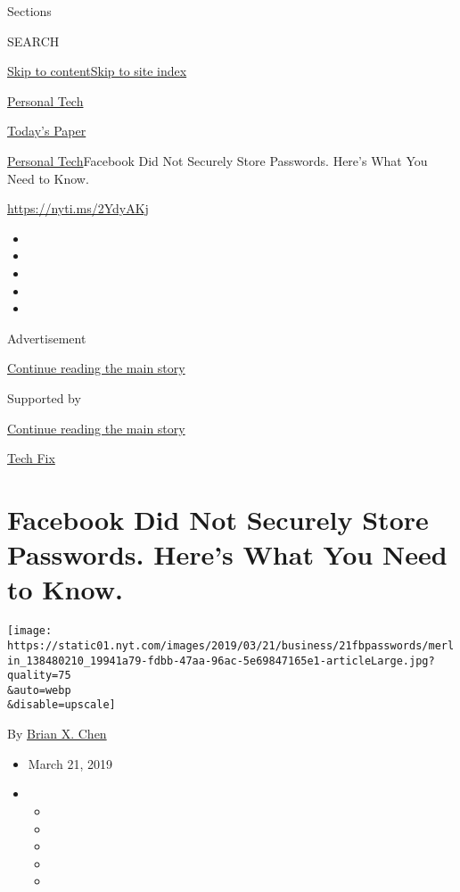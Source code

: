 Sections

SEARCH

\protect\hyperlink{site-content}{Skip to
content}\protect\hyperlink{site-index}{Skip to site index}

\href{https://www.nytimes.com/section/technology/personaltech}{Personal
Tech}

\href{https://myaccount.nytimes.com/auth/login?response_type=cookie\&client_id=vi}{}

\href{https://www.nytimes.com/section/todayspaper}{Today's Paper}

\href{/section/technology/personaltech}{Personal Tech}\textbar{}Facebook
Did Not Securely Store Passwords. Here's What You Need to Know.

\url{https://nyti.ms/2YdyAKj}

\begin{itemize}
\item
\item
\item
\item
\item
\end{itemize}

Advertisement

\protect\hyperlink{after-top}{Continue reading the main story}

Supported by

\protect\hyperlink{after-sponsor}{Continue reading the main story}

\href{/column/tech-fix}{Tech Fix}

\hypertarget{facebook-did-not-securely-store-passwords-heres-what-you-need-to-know}{%
\section{Facebook Did Not Securely Store Passwords. Here's What You Need
to
Know.}\label{facebook-did-not-securely-store-passwords-heres-what-you-need-to-know}}

\texttt{[image: https://static01.nyt.com/images/2019/03/21/business/21fbpasswords/merlin\_138480210\_19941a79-fdbb-47aa-96ac-5e69847165e1-articleLarge.jpg?quality=75\\\&auto=webp\\\&disable=upscale]}

By \href{https://www.nytimes.com/by/brian-x-chen}{Brian X. Chen}

\begin{itemize}
\item
  March 21, 2019
\item
  \begin{itemize}
  \item
  \item
  \item
  \item
  \item
  \end{itemize}
\end{itemize}

